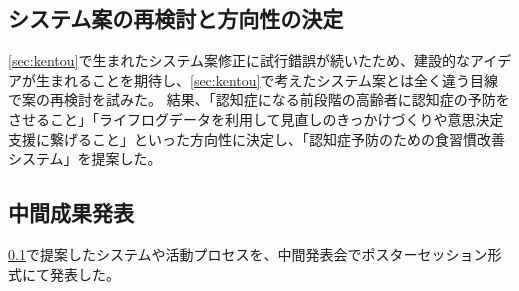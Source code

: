 \documentclass[../report]{subfiles}
\begin{document}
\subsection{システム案の再検討と方向性の決定}\label{sec:saikentou}
\ref{sec:kentou}で生まれたシステム案修正に試行錯誤が続いたため、建設的なアイデアが生まれることを期待し、\ref{sec:kentou}で考えたシステム案とは全く違う目線で案の再検討を試みた。
結果、「認知症になる前段階の高齢者に認知症の予防をさせること」「ライフログデータを利用して見直しのきっかけづくりや意思決定支援に繋げること」といった方向性に決定し、「認知症予防のための食習慣改善システム」を提案した。

\subsection{中間成果発表}
\ref{sec:saikentou}で提案したシステムや活動プロセスを、中間発表会でポスターセッション形式にて発表した。
\end{document}
